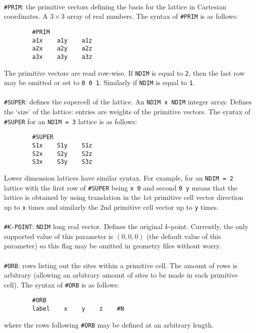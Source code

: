 \documentclass[12pt]{article}
\begin{document}
        \\
        \texttt{\#PRIM}: the primitive vectors defining the basis for the lattice in Cartesian coordinates.
        A $3\times 3$ array of real numbers.
        The syntax of \texttt{\#PRIM} is as follows:
        \begin{verbatim}
        #PRIM
        a1x    a1y    a1z
        a2x    a2y    a2z
        a3x    a3y    a3z
        \end{verbatim}
        The primitive vectors are read row-wise.
        If \texttt{NDIM} is equal to \texttt{2}, then the last row may be omitted or set to \texttt{0    0    1}.
        Similarly if \texttt{NDIM} is equal to \texttt{1}. \\
        \\
        \texttt{\#SUPER}: defines the supercell of the lattice.
        An \texttt{NDIM x NDIM} integer array.
        Defines the `size' of the lattice: entries are weights of the primitive vectors.
        The syntax of \texttt{\#SUPER} for an \texttt{NDIM = 3} lattice is as follows:
        \begin{verbatim}
        #SUPER
        S1x    S1y    S1z
        S2x    S2y    S2z
        S3x    S3y    S3z
        \end{verbatim}
        Lower dimension lattices have similar syntax.
        For example, for an \texttt{NDIM = 2} lattice with the first row of \texttt{\#SUPER} being \texttt{x    0} and second \texttt{0    y} means that the lattice is obtained by using translation in the $1$st primitive cell vector direction up to \texttt{x} times and similarly the $2$nd primitive cell vector up to \texttt{y} times. \\
        \\
        \texttt{\#K-POINT}: \texttt{NDIM} long real vector. Defines the original $k$-point.
        Currently, the only supported value of this parameter is $(0,0,0)$ (the default value of this parameter) so this flag may be omitted in geometry files without worry. \\
        \\
        \texttt{\#ORB}: rows listing out the sites within a primitive cell.
        The amount of rows is arbitrary (allowing an arbitrary amount of sites to be made in each primitive cell).
        The syntax of \texttt{\#ORB} is as follows:
        \begin{verbatim}
        #ORB
        label    x    y    z    #N
        \end{verbatim}
        where the rows following \texttt{\#ORB} may be defined at an arbitrary length.
\end{document}
